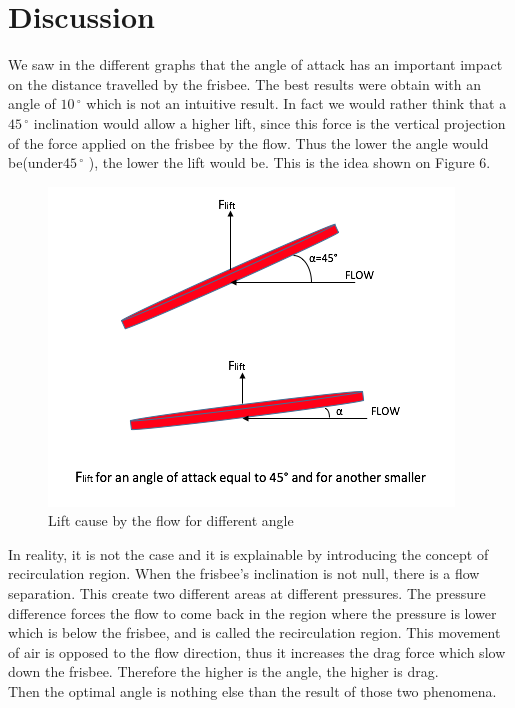 \documentclass[10pt,a4paper]{report}
\begin{document}
\section{Discussion}
We saw in the different graphs that the angle of attack has an important impact on the distance travelled by the frisbee. The best results were obtain with an angle of $10\,^{\circ}$ which is not an intuitive result. In fact we would rather think that a $45\,^{\circ}$ inclination would allow a higher lift, since this force is the vertical projection of the force applied on the frisbee by the flow. Thus the lower the angle would be(under$45\,^{\circ}$ ), the lower the lift would be. This is the idea shown on Figure 6.
\begin{figure}[!h]
\centering
\includegraphics[scale=0.6]{intuitive.jpg}
\caption{Lift cause by the flow for different angle}
\label{Lift cause by the flow for different angle}
\end{figure}
In reality, it is not the case and it is explainable by introducing the concept of recirculation region. When the frisbee's inclination is not null, there is a flow separation. This create two different areas at different pressures. The pressure difference forces the flow to come back in the region where the pressure is lower which is below the frisbee, and is called the recirculation region. This movement of air is opposed to the flow direction, thus it increases the drag force which slow down the frisbee. Therefore the higher is the angle, the higher is drag.
\\Then the optimal angle is nothing else than the result of those two phenomena.
\end{document}
